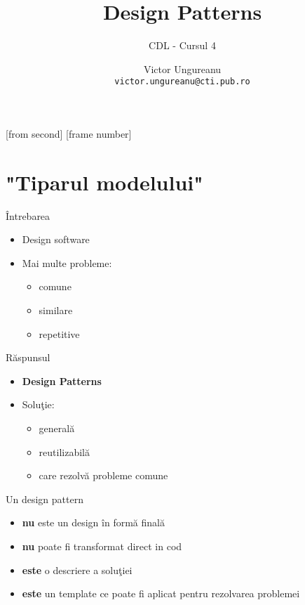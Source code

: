 \documentclass{beamer}
\title[Design Patterns]{Design Patterns}
\subtitle{CDL - Cursul 4}
\institute[ROSEdu]{ROSEdu}
\author[VictorU]{Victor Ungureanu \\ \texttt{victor.ungureanu@cti.pub.ro} }
\begin{document}
[from second]
[frame number]

\frame{\titlepage}

\frame{\tableofcontents}


\section{"Tiparul modelului"}

\begin{frame}{Întrebarea}
	\begin{itemize}
  		\item Design software
  		\vspace{4mm}
  		\item Mai multe probleme:
  		\begin{itemize}
	  		\item comune
  			\item similare
  			\item repetitive
  		\end{itemize}
	\end{itemize}
\end{frame}

\begin{frame}{Răspunsul}
	\begin{itemize}
		\item \textbf{Design Patterns}
		\vspace{4mm}
  		\item Soluţie:
  		\begin{itemize}
	  		\item generală
  			\item reutilizabilă
  			\item care rezolvă probleme comune
  		\end{itemize}
	\end{itemize}
\end{frame}

\begin{frame}{Un design pattern}
	\begin{itemize}
	  	\item \textbf{nu} este un design în formă finală
	  	\vspace{4mm}
	  	\item \textbf{nu} poate fi transformat direct in cod
	  	\vspace{4mm}
	  	\item \textbf{este} o descriere a soluţiei
	  	\vspace{4mm}
	  	\item \textbf{este} un template ce poate fi aplicat pentru rezolvarea problemei
	\end{itemize}
\end{frame}
\end{document}
